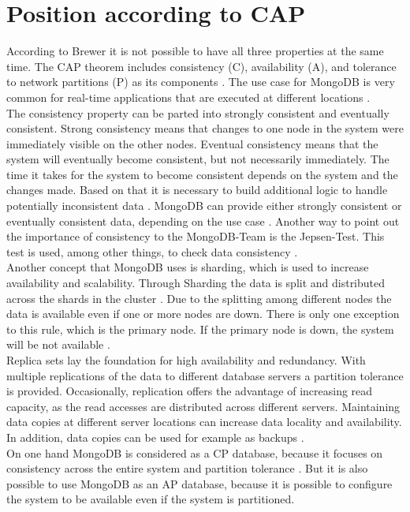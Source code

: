 
\section{Position according to CAP}

According to Brewer it is not possible to have all three properties at the same time.
The CAP theorem includes consistency (C), availability (A), and tolerance to network partitions (P) as its components \parencite{Brewer2000}.
The use case for MongoDB is very common for real-time applications that are executed at different locations \parencite{Jayasekara2021}.
\\
The consistency property can be parted into strongly consistent and eventually consistent. 
Strong consistency means that changes to one node in the system were immediately visible on the other nodes.
Eventual consistency means that the system will eventually become consistent, but not necessarily immediately. 
The time it takes for the system to become consistent depends on the system and the changes made.
Based on that it is necessary to build additional logic to handle potentially inconsistent data \parencite[p. 4-5]{MongoDB2018}.
MongoDB can provide either strongly consistent or eventually consistent data, depending on the use case \parencite[p. 5]{MongoDB2018}.
Another way to point out the importance of consistency to the MongoDB-Team is the Jepsen-Test.
This test is used, among other things, to check data consistency \parencite{Mongo-Jepsen}.
\\
Another concept that MongoDB uses is sharding, which is used to increase availability and scalability. 
Through Sharding the data is split and distributed across the shards in the cluster \parencites{Mongo-Sharding}[p. 7]{Membrey2014}.
Due to the splitting among different nodes the data is available even if one or more nodes are down. 
There is only one exception to this rule, which is the primary node. If the primary node is down, the system will be not available \parencites{Mongo-Sharding}. 
\\
Replica sets lay the foundation for high availability and redundancy. With multiple replications of the data to different database servers a partition tolerance is provided.
Occasionally, replication offers the advantage of increasing read capacity, as the read accesses are distributed across different servers.
Maintaining data copies at different server locations can increase data locality and availability. In addition, data copies can be used for example as backups \parencite{Mongo-Replication}.
\\
On one hand MongoDB is considered as a CP database, because it focuses on consistency across the entire system and partition tolerance \parencite{Jayasekara2021}.
But it is also possible to use MongoDB as an AP database, because it is possible to configure the system to be available even if the system is partitioned.

